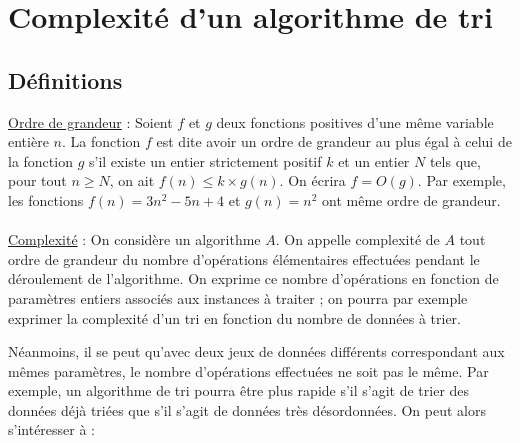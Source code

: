 \documentclass[t,11pt]{article}
\begin{document}
\section{Complexité d'un algorithme de tri}
\subsection{Définitions}
\begin{framed}
\noindent
\underline{Ordre de grandeur} :
Soient $f$ et $g$ deux fonctions positives d'une même variable entière $n$. La fonction $f$ est dite avoir un ordre de grandeur au plus égal à celui de la fonction $g$ s'il existe un entier
strictement positif $k$ et un entier $N$ tels que, pour tout $n \geq N$, on ait $f(n) \leq k \times g(n)$. 
On écrira $f = O(g)$. Par exemple, les fonctions $f(n) = 3 n^{2} - 5 n + 4$ et
$g(n) = n^{2}$ ont même ordre de grandeur.\\
\\
\noindent
\underline{Complexité} :
On considère un algorithme $A$. On appelle complexité de $A$ tout ordre de grandeur du
nombre d'opérations élémentaires effectuées pendant le déroulement de l'algorithme. On
exprime ce nombre d'opérations en fonction de paramètres entiers associés aux instances à
traiter ; on pourra par exemple exprimer la complexité d’un tri en fonction du nombre de
données à trier. 
\end{framed}

\noindent
Néanmoins, il se peut qu’avec deux jeux de données différents correspondant
aux mêmes paramètres, le nombre d’opérations effectuées ne soit pas le même. Par exemple,
un algorithme de tri pourra être plus rapide s’il s’agit de trier des données déjà triées que s’il
s’agit de données très désordonnées. On peut alors s’intéresser à :
\end{document}
